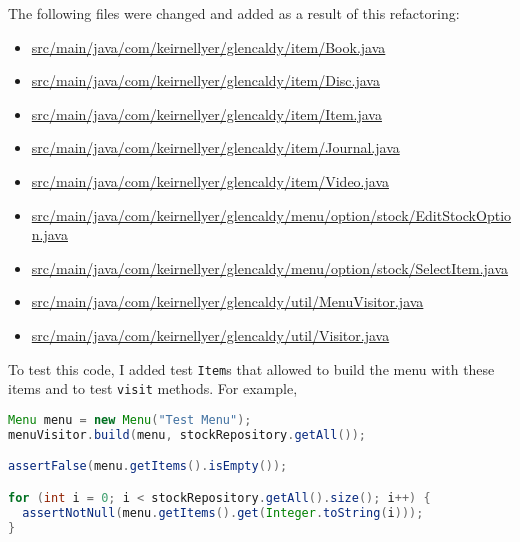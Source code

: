 \documentclass{article}
\newcommand{\code}[1]{\texttt{#1}}
\begin{document}
The following files were changed and added as a result of this refactoring:
\begin{itemize}
  \item \href{https://github.com/awave1/assessment-loan-system/commit/2534ae1e8b711ad62fca8e783b861151951a8f02#diff-54a69d7c35e29e31112b9482279f7728}{src/main/java/com/keirnellyer/glencaldy/item/Book.java}
  \item \href{https://github.com/awave1/assessment-loan-system/commit/2534ae1e8b711ad62fca8e783b861151951a8f02#diff-ffa15ba834ac42bda93108046f2e3e1d}{src/main/java/com/keirnellyer/glencaldy/item/Disc.java}
  \item \href{https://github.com/awave1/assessment-loan-system/commit/2534ae1e8b711ad62fca8e783b861151951a8f02#diff-1fa65bd290d78e7f9e8a0983709d279f}{src/main/java/com/keirnellyer/glencaldy/item/Item.java}
  \item \href{https://github.com/awave1/assessment-loan-system/commit/2534ae1e8b711ad62fca8e783b861151951a8f02#diff-fd27721b429fa9fc4dbaf6aabcd2512d}{src/main/java/com/keirnellyer/glencaldy/item/Journal.java}
  \item \href{https://github.com/awave1/assessment-loan-system/commit/2534ae1e8b711ad62fca8e783b861151951a8f02#diff-3d39eb9fe1d2e7bb2073c8b6e612eaa2}{src/main/java/com/keirnellyer/glencaldy/item/Video.java}
  \item \href{src/main/java/com/keirnellyer/glencaldy/menu/option/stock/EditStockOption.java}{src/main/java/com/keirnellyer/glencaldy/menu/option/stock/EditStockOption.java}
  \item \href{src/main/java/com/keirnellyer/glencaldy/menu/option/stock/SelectItem.java}{src/main/java/com/keirnellyer/glencaldy/menu/option/stock/SelectItem.java}
  \item \href{https://github.com/awave1/assessment-loan-system/commit/2534ae1e8b711ad62fca8e783b861151951a8f02#diff-73e174fc5f923546624d5c4206572c47}{src/main/java/com/keirnellyer/glencaldy/util/MenuVisitor.java}
  \item \href{https://github.com/awave1/assessment-loan-system/commit/2534ae1e8b711ad62fca8e783b861151951a8f02#diff-ce10c0cc207b42495013fef20915f5ab}{src/main/java/com/keirnellyer/glencaldy/util/Visitor.java}
\end{itemize}

To test this code, I added test \code{Item}s that allowed to build the menu with these items and to test \code{visit} methods. For example,
\begin{lstlisting}[language=Java]
Menu menu = new Menu("Test Menu");
menuVisitor.build(menu, stockRepository.getAll());

assertFalse(menu.getItems().isEmpty());

for (int i = 0; i < stockRepository.getAll().size(); i++) {
  assertNotNull(menu.getItems().get(Integer.toString(i)));
}
\end{lstlisting}
\end{document}
